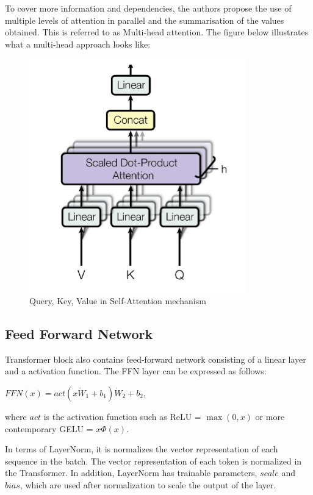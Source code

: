 \documentclass[PMI,VKR]{HSEUniversity}
\begin{document}
To cover more information and dependencies, the authors propose the use of multiple levels of attention in parallel and the summarisation of the values obtained. 
This is referred to as Multi-head attention. The figure below illustrates what a multi-head approach looks like:

\begin{figure}[h]
    \centering
    \includegraphics[scale=0.7]{img/multi-head.png}
    \caption{Query, Key, Value in Self-Attention mechanism}
\end{figure}

\subsection{Feed Forward Network}

Transformer block also contains feed-forward network consisting of a linear layer and a activation function.
The FFN layer can be expressed as follows:
\begin{center}
    $FFN(x) = act(x \dot W_{1} + b_{1}) \dot W_{2} + b_{2}$, \\    
\end{center}
where $act$ is the activation function such as ReLU = $\max(0, x)$ or more contemporary GELU = $x\Phi(x)$.

In terms of LayerNorm, it is normalizes the vector representation of each sequence in the batch. 
The vector representation of each token is normalized in the Transformer. 
In addition, LayerNorm has trainable parameters, $scale$ and $bias$, which are used after normalization to scale the output of the layer.
\end{document}
